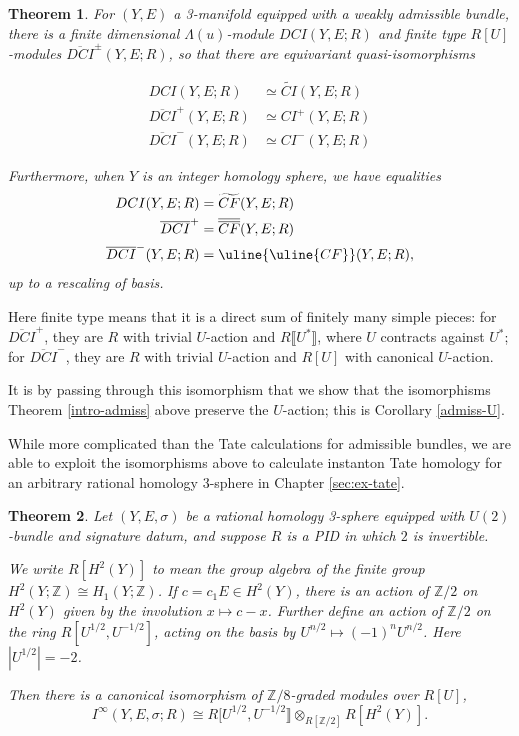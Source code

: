 \documentclass{memo-l}
\newtheorem{theorem}{Theorem}[chapter]
\theoremstyle{definition}
\theoremstyle{remark}
\numberwithin{section}{chapter}
\numberwithin{equation}{chapter}
\begin{document}
\begin{theorem}For $(Y,E)$ a 3-manifold equipped with a weakly admissible bundle, there is a finite dimensional $\Lambda(u)$-module $DCI(Y,E;R)$ and finite type $R[U]$-modules $\overline{DCI}^\pm(Y,E;R)$, so that there are equivariant quasi-isomorphisms 

\begin{align*}DCI(Y,E;R) &\simeq \widetilde{CI}(Y,E;R) \\
\overline{DCI}^+(Y,E;R) &\simeq CI^+(Y,E;R) \\
\overline{DCI}^-(Y,E;R) &\simeq CI^-(Y,E;R)
\end{align*}

Furthermore, when $Y$ is an integer homology sphere, we have equalities
\begin{align*}DCI(Y,E;R) &= \widetilde{CF}(Y,E;R) \\
\overline{DCI}^+ &= \overline{\overline{CF}}(Y,E;R) \\
\overline{DCI}^-(Y,E;R) &= \uline{\uline{CF}}(Y,E;R),
\end{align*}
up to a rescaling of basis.
\end{theorem}

Here finite type means that it is a direct sum of finitely many simple pieces: for $\overline{DCI}^+$, they are $R$ with trivial $U$-action and $R\llbracket U^*\rrbracket$, where $U$ contracts against $U^*$; for $\overline{DCI}^-$, they are $R$ with trivial $U$-action and $R[U]$ with canonical $U$-action. 

It is by passing through this isomorphism that we show that the isomorphisms Theorem \ref{intro-admiss} above preserve the $U$-action; this is Corollary \ref{admiss-U}.

While more complicated than the Tate calculations for admissible bundles, we are able to exploit the isomorphisms above to calculate instanton Tate homology for an arbitrary rational homology 3-sphere in Chapter \ref{sec:ex-tate}.

\begin{theorem}\label{intro-tate}Let $(Y,E,\sigma)$ be a rational homology 3-sphere equipped with $U(2)$-bundle and signature datum, and suppose $R$ is a PID in which $2$ is invertible.

We write $R[H^2(Y)]$ to mean the group algebra of the finite group $H^2(Y;\mathbb Z) \cong H_1(Y;\mathbb Z)$. If $c = c_1 E \in H^2(Y)$, there is an action of $\mathbb Z/2$ on $H^2(Y)$ given by the involution $x \mapsto c-x$. Further define an action of $\mathbb Z/2$ on the ring $R[U^{1/2}, U^{-1/2}]$, acting on the basis by $U^{n/2} \mapsto (-1)^n U^{n/2}$. Here $|U^{1/2}| = -2$.

Then there is a canonical isomorphism of $\mathbb Z/8$-graded modules over $R[U]$,  $$I^\infty(Y,E,\sigma;R) \cong R[U^{1/2},U^{-1/2}\rrbracket \otimes_{R[\mathbb Z/2]} R[H^2(Y)].$$
\end{theorem}
\end{document}
